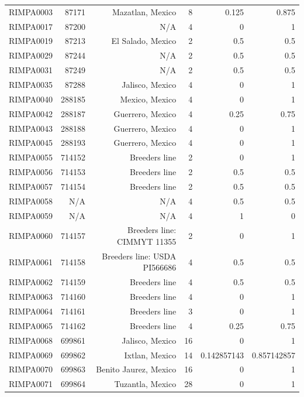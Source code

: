 \documentclass[12pt]{article}
\begin{document}
\begin{table}[htbp]
\begin{tabular}{rrrrrr}
    RIMPA0003 & 87171 & Mazatlan, Mexico & 8     & 0.125 & 0.875 \\
    RIMPA0017 & 87200 & N/A   & 4     & 0     & 1 \\
    RIMPA0019 & 87213 & El Salado, Mexico & 2     & 0.5   & 0.5 \\
    RIMPA0029 & 87244 & N/A   & 2     & 0.5   & 0.5 \\
    RIMPA0031 & 87249 & N/A   & 2     & 0.5   & 0.5 \\
    RIMPA0035 & 87288 & Jalisco, Mexico & 4     & 0     & 1 \\
    RIMPA0040 & 288185 & Mexico, Mexico & 4     & 0     & 1 \\
    RIMPA0042 & 288187 & Guerrero, Mexico & 4     & 0.25  & 0.75 \\
    RIMPA0043 & 288188 & Guerrero, Mexico & 4     & 0     & 1 \\
    RIMPA0045 & 288193 & Guerrero, Mexico & 4     & 0     & 1 \\
    RIMPA0055 & 714152 & Breeders line & 2     & 0     & 1 \\
    RIMPA0056 & 714153 & Breeders line & 2     & 0.5   & 0.5 \\
    RIMPA0057 & 714154 & Breeders line & 2     & 0.5   & 0.5 \\
    RIMPA0058 & N/A   & N/A   & 4     & 0.5   & 0.5 \\
    RIMPA0059 & N/A   & N/A   & 4     & 1     & 0 \\
    RIMPA0060 & 714157 & Breeders line: CIMMYT 11355 & 2     & 0     & 1 \\
    RIMPA0061 & 714158 & Breeders line: USDA PI566686 & 4     & 0.5   & 0.5 \\
    RIMPA0062 & 714159 & Breeders line & 4     & 0.5   & 0.5 \\
    RIMPA0063 & 714160 & Breeders line & 4     & 0     & 1 \\
    RIMPA0064 & 714161 & Breeders line & 3     & 0     & 1 \\
    RIMPA0065 & 714162 & Breeders line & 4     & 0.25  & 0.75 \\
    RIMPA0068 & 699861 & Jalisco, Mexico & 16    & 0     & 1 \\
    RIMPA0069 & 699862 & Ixtlan, Mexico & 14    & 0.142857143 & 0.857142857 \\
    RIMPA0070 & 699863 & Benito Jaurez, Mexico & 16    & 0     & 1 \\
    RIMPA0071 & 699864 & Tuzantla, Mexico & 28    & 0     & 1 \\

\end{tabular}
\end{table}
\end{document}
